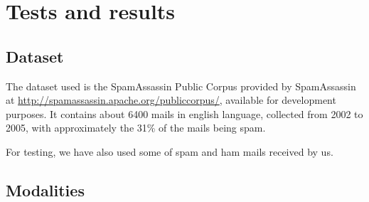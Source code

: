 \section{Tests and results}
\subsection{Dataset}
The dataset used is the SpamAssassin Public Corpus provided by SpamAssassin at \url{http://spamassassin.apache.org/publiccorpus/}, available for development purposes. It contains about 6400 mails in english language, collected from 2002 to 2005, with approximately the 31\% of the mails being spam.

For testing, we have also used some of spam and ham mails received by us.

\subsection{Modalities}

